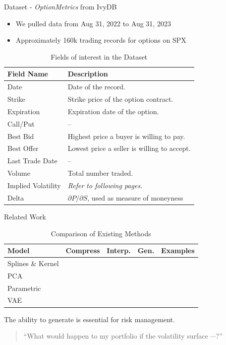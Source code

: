 \documentclass{beamer}
\newcommand{\tick}{\ding{51}}
\begin{document}



\begin{frame}{Dataset - \textit{OptionMetrics} from IvyDB}
    \begin{itemize}
        \item We pulled data from Aug 31, 2022 to Aug 31, 2023
        \item Approximately 160k trading records for options on SPX 
    \end{itemize}
    \begin{table}[h]
    \centering
    \begin{tabular}{|l|l|}
    \hline
    \textbf{Field Name} & \textbf{Description} \\
    \hline
    Date & Date of the record. \\
    Strike & Strike price of the option contract. \\
    Expiration & Expiration date of the option. \\
    Call/Put & -- \\
    Best Bid & Highest price a buyer is willing to pay. \\
    Best Offer & Lowest price a seller is willing to accept. \\
    Last Trade Date & -- \\
    Volume & Total number traded. \\
    Implied Volatility & \textit{Refer to following pages.} \\
    Delta & $\partial P / \partial S$, used as measure of moneyness \\
    \hline
    \end{tabular}
    \caption{Fields of interest in the Dataset}
    \end{table}
\end{frame}

\begin{frame}{Related Work}
    \begin{table}[h]
    \centering
    \begin{tabular}{|l|c|c|c|c|}
    \hline
    \textbf{Model} & \textbf{Compress} & \textbf{Interp.} & \textbf{Gen.} & \textbf{Examples} \\
    \hline
    Splines \& Kernel & & \tick & & \citet{orosi2012empirical}\\ \hline
    PCA & \tick & & & \citet{Sylla2000}\\ \hline 
    Parametric & \tick & \tick & & \citet{wolfram_volsurface_heston}\\ \hline
    VAE & \tick & \tick & \tick & \citet{vaeorigin}\\
    \hline
    \end{tabular}
    \caption{Comparison of Existing Methods}
    \end{table}
    The ability to generate is essential for risk management. 
    \begin{quote}
        ``What would happen to my portfolio if the volatility surface $\cdots$?''
    \end{quote}
\end{frame}
\end{document}
